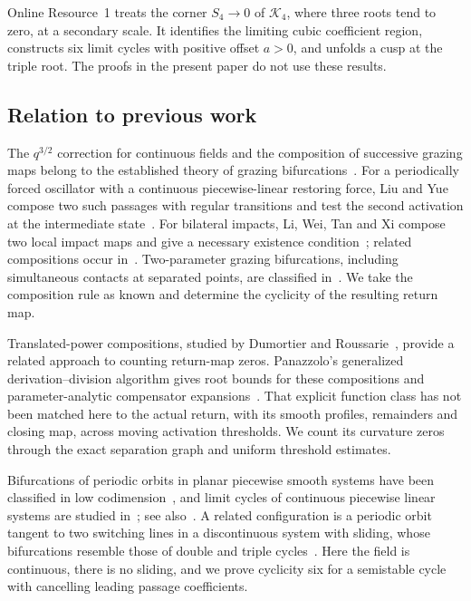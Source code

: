 Online Resource~1 treats the corner $S_4\to0$ of $\mathcal K_4$, where three
roots tend to zero, at a secondary scale. It identifies the limiting cubic
coefficient region, constructs six limit cycles with positive offset $a>0$,
and unfolds a cusp at the triple root. The proofs in the present paper do not
use these results.

\subsection{Relation to previous work}\label{sec:boundaries}

The $q^{3/2}$ correction for continuous fields and the composition of
successive grazing maps belong to the established theory of grazing
bifurcations~\cite{nordmark1991,dibbc2001,nordmark2002,dibernardo2008,colombo2012}. For a
periodically forced oscillator with a continuous piecewise-linear restoring
force, Liu and Yue compose two such passages with regular transitions and test
the second activation at the intermediate state~\cite{liuyue2023}. For
bilateral impacts, Li, Wei, Tan and Xi compose two local impact maps and give a
necessary existence condition~\cite[Theorem~1]{liweitanxi2014}; related
compositions occur in~\cite{lilimeng2021,miao2023}. Two-parameter grazing
bifurcations, including simultaneous contacts at separated points, are
classified in~\cite{kowalczyk2006}. We take the composition rule as known and
determine the cyclicity of the resulting return map.

Translated-power compositions, studied by Dumortier and
Roussarie~\cite{dumortierroussarie2008}, provide a related approach to
counting return-map zeros. Panazzolo's generalized derivation--division
algorithm gives root bounds for these compositions and parameter-analytic
compensator expansions~\cite[arXiv version, Theorem~2.2, Sections~3--4 and
Proposition~5.2]{panazzolo2024}. That explicit function class has not been
matched here to the actual return, with its smooth profiles, remainders and
closing map, across moving activation thresholds. We count its curvature
zeros through the exact separation graph and uniform threshold estimates.

Bifurcations of periodic orbits in planar piecewise smooth systems have been
classified in low codimension~\cite{kuznetsov2003,guardia2011}, and limit
cycles of continuous piecewise linear systems are studied
in~\cite{freire1998}; see also~\cite{simpson2010}. A related configuration is
a periodic orbit tangent to two switching lines in a discontinuous
system with sliding, whose bifurcations resemble those of double and triple
cycles~\cite{roitenberg2025}. Here the field is continuous, there is no
sliding, and we prove cyclicity six for a semistable cycle with cancelling
leading passage coefficients.

